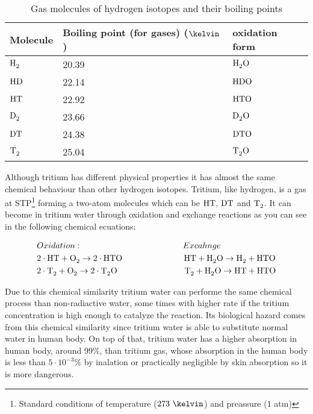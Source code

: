 \begin{table}[htbp]
\begin{center}
\begin{tabular}{|l|l|l|}
\hline
Molecule & Boiling point (for gases) ($\kelvin$) & oxidation form\\
\hline \hline \hline
$\ce{H_2}$ & 20.39 & $\ce{H_2 O}$ \\ \hline
$\ce{HD}$ & 22.14 & $\ce{HDO}$ \\ \hline
$\ce{HT}$ & 22.92 & $\ce{HTO}$ \\ \hline
$\ce{D_2}$ & 23.66 & $\ce{D_2 O}$ \\ \hline
$\ce{DT}$ & 24.38 & $\ce{DTO}$ \\ \hline
$\ce{T_2}$ & 25.04 & $\ce{T_2 O}$ \\ \hline
\end{tabular}
\caption{Gas molecules of hydrogen isotopes and their boiling points}
\label{tab:BoillingPoints}
\end{center}
\end{table}

Although tritium has different physical properties it has almost the same chemical behaviour than other hydrogen isotopes. Tritium, like hydrogen, is a gas at STP\footnote{Standard conditions of temperature ($273~\kelvin$) and preassure ($1$ atm)} forming a two-atom molecules which can be $\ce{HT}$, $\ce{DT}$ and $\ce{T_2}$. It can become in tritium water through oxidation and exchange reactions as you can see in the following chemical ecuations\cite{TritiumHandling}:

\begin{equation}
\begin{split}
& Oxidation: \qquad \qquad \qquad \qquad \qquad \qquad Excahnge\\
& 2\cdot{}\ce{HT} + \ce{O_2} \rightarrow 2 \cdot{} \ce{HTO} ~ \quad \qquad \qquad \qquad \ce{HT} + \ce{H_2 O} \rightarrow \ce{H_2} + \ce{HTO}\\
& 2\cdot{}\ce{T_2} + \ce{O_2} \rightarrow 2 \cdot{} \ce{T_2 O} \qquad \qquad \qquad \qquad \ce{T_2} + \ce{H_2 O} \rightarrow \ce{HT} + \ce{HTO}
\label{eq:OxidationExchange}
\end{split}
\end{equation}

Due to this chemical similarity tritium water can performe the same chemical process than non-radiactive water, some times with higher rate if the tritium concentration is high enough to catalyze the reaction. Its biological hazard comes from this chemical similarity since tritium water is able to substitute normal water in human body. On top of that, tritium water has a higher absorption in human body, around 99\%, than tritium gas, whose absorption in the human body is less than $5 \cdot 10^{-3}\%$  by inalation or practically negligible by skin absorption \cite{TritiumHandling} so it is more dangerous.
